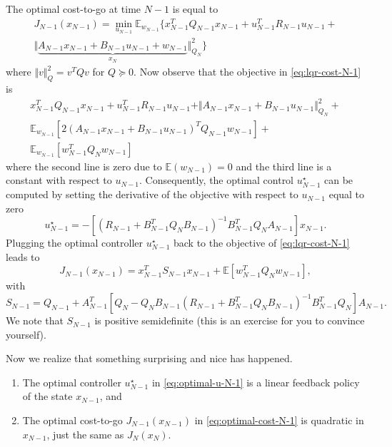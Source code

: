 \documentclass[
]{book}
\theoremstyle{definition}
\theoremstyle{definition}
\theoremstyle{definition}
\theoremstyle{definition}
\theoremstyle{remark}
\begin{document}
The optimal cost-to-go at time \(N-1\) is equal to
\begin{equation}
\begin{split}
J_{N-1}(x_{N-1}) = \min_{u_{N-1}} \mathbb{E}_{w_{N-1}} \{ x_{N-1}^T Q_{N-1} x_{N-1} + u_{N-1}^T R_{N-1} u_{N-1} + \\ \Vert \underbrace{A_{N-1} x_{N-1} + B_{N-1} u_{N-1} + w_{N-1} }_{x_N} \Vert^2_{Q_N} \}
\end{split}
\label{eq:lqr-cost-N-1}
\end{equation}
where \(\Vert v \Vert_Q^2 = v^T Q v\) for \(Q \succeq 0\). Now observe that the objective in \eqref{eq:lqr-cost-N-1} is
\begin{equation}
\begin{split}
x_{N-1}^T Q_{N-1} x_{N-1} + u_{N-1}^T R_{N-1} u_{N-1} + \Vert A_{N-1} x_{N-1} + B_{N-1} u_{N-1} \Vert_{Q_N}^2 + \\
\mathbb{E}_{w_{N-1}} \left[ 2(A_{N-1} x_{N-1} + B_{N-1} u_{N-1} )^T Q_{N-1} w_{N-1} \right] + \\
\mathbb{E}_{w_{N-1}} \left[ w_{N-1}^T Q_N w_{N-1} \right]
\end{split}
\end{equation}
where the second line is zero due to \(\mathbb{E}(w_{N-1}) = 0\) and the third line is a constant with respect to \(u_{N-1}\). Consequently, the optimal control \(u_{N-1}^\star\) can be computed by setting the derivative of the objective with respect to \(u_{N-1}\) equal to zero
\begin{equation}
u_{N-1}^\star = - \left[ \left( R_{N-1} + B_{N-1}^T Q_N B_{N-1} \right)^{-1} B_{N-1}^T Q_N A_{N-1} \right] x_{N-1}.
\label{eq:optimal-u-N-1}
\end{equation}
Plugging the optimal controller \(u^\star_{N-1}\) back to the objective of \eqref{eq:lqr-cost-N-1} leads to
\begin{equation}
J_{N-1}(x_{N-1}) = x_{N-1}^T S_{N-1} x_{N-1} + \mathbb{E} \left[ w_{N-1}^T Q_N w_{N-1} \right],
\label{eq:optimal-cost-N-1}
\end{equation}
with
\[
S_{N-1} = Q_{N-1} + A_{N-1}^T \left[ Q_N - Q_N B_{N-1} \left( R_{N-1} + B_{N-1}^T Q_N B_{N-1} \right)^{-1} B_{N-1}^T Q_N \right] A_{N-1}.
\]
We note that \(S_{N-1}\) is positive semidefinite (this is an exercise for you to convince yourself).

Now we realize that something surprising and nice has happened.

\begin{enumerate}
\def\labelenumi{\arabic{enumi}.}
\item
  The optimal controller \(u^{\star}_{N-1}\) in \eqref{eq:optimal-u-N-1} is a linear feedback policy of the state \(x_{N-1}\), and
\item
  The optimal cost-to-go \(J_{N-1}(x_{N-1})\) in \eqref{eq:optimal-cost-N-1} is quadratic in \(x_{N-1}\), just the same as \(J_{N}(x_N)\).
\end{enumerate}
\end{document}
